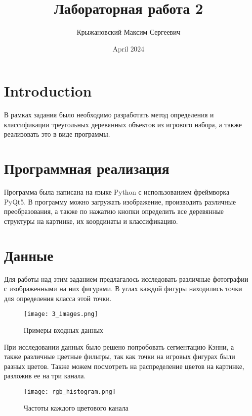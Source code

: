 \documentclass{article}
\title{Лабораторная работа 2}
\author{Крыжановский Максим Сергеевич}
\date{April 2024}
\begin{document}
\maketitle

\section{Introduction}

В рамках задания было необходимо разработать метод определения и классификации треугольных деревянных объектов из игрового набора, а также реализовать это в виде программы.

\section{Программная реализация}
Программа была написана на языке Python с использованием фреймворка PyQt5. В программу можно загружать изображение, производить различные преобразования, а также по нажатию кнопки определить все деревянные структуры на картинке, их координаты и классификацию.

\section{Данные}
Для работы над этим заданием предлагалось исследовать различные фотографии с изображенными на них фигурами. В углах каждой фигуры находились точки для определения класса этой точки.

\begin{figure}[h!]
    \centering
    \texttt{[image: 3\_images.png]}
    \caption{Примеры входных данных}
    \label{fig:enter-label}
\end{figure}

При исследовании данных было решено попробовать сегментацию Кэнни, а также различные цветные фильтры, так как точки на игровых фигурах были разных цветов. Также можем посмотреть на распределение цветов на картинке, разложив ее на три канала.

\begin{figure}[h!]
    \centering
    \texttt{[image: rgb\_histogram.png]}
    \caption{Частоты каждого цветового канала}
    \label{fig:enter-label}
\end{figure}
\end{document}
